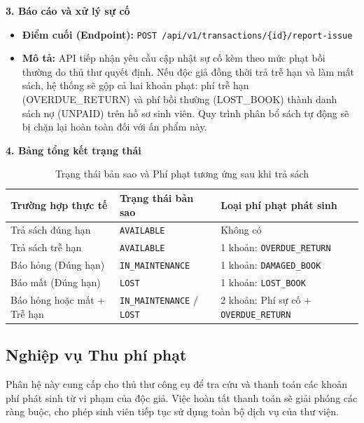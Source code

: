 \noindent\textbf{3. Báo cáo và xử lý sự cố}
\begin{itemize}
    \item \textbf{Điểm cuối (Endpoint):} \texttt{POST /api/v1/transactions/\{id\}/report-issue}
    \item \textbf{Mô tả:} API tiếp nhận yêu cầu cập nhật sự cố kèm theo mức phạt bồi thường do thủ thư quyết định. Nếu độc giả đồng thời trả trễ hạn và làm mất sách, hệ thống sẽ gộp cả hai khoản phạt: phí trễ hạn (OVERDUE\_RETURN) và phí bồi thường (LOST\_BOOK) thành danh sách nợ (UNPAID) trên hồ sơ sinh viên. Quy trình phân bổ sách tự động sẽ bị chặn lại hoàn toàn đối với ấn phẩm này.
\end{itemize}

\noindent\textbf{4. Bảng tổng kết trạng thái}
\begin{table}[H]
    \centering
    \caption{Trạng thái bản sao và Phí phạt tương ứng sau khi trả sách}
    \renewcommand{\arraystretch}{1.3}
    \begin{tabularx}{\textwidth}{|l|l|X|}
        \hline
        \textbf{Trường hợp thực tế} & \textbf{Trạng thái bản sao} & \textbf{Loại phí phạt phát sinh} \\ \hline
        Trả sách đúng hạn & \texttt{AVAILABLE} & Không có \\ \hline
        Trả sách trễ hạn & \texttt{AVAILABLE} & 1 khoản: \texttt{OVERDUE\_RETURN} \\ \hline
        Báo hỏng (Đúng hạn) & \texttt{IN\_MAINTENANCE} & 1 khoản: \texttt{DAMAGED\_BOOK} \\ \hline
        Báo mất (Đúng hạn) & \texttt{LOST} & 1 khoản: \texttt{LOST\_BOOK} \\ \hline
        Báo hỏng hoặc mất + Trễ hạn & \texttt{IN\_MAINTENANCE} / \texttt{LOST} & 2 khoản: Phí sự cố + \texttt{OVERDUE\_RETURN}  \\ \hline
    \end{tabularx}
\end{table}


\subsection{Nghiệp vụ Thu phí phạt}

Phân hệ này cung cấp cho thủ thư công cụ để tra cứu và thanh toán các khoản phí phát sinh từ vi phạm của độc giả. Việc hoàn tất thanh toán sẽ giải phóng các ràng buộc, cho phép sinh viên tiếp tục sử dụng toàn bộ dịch vụ của thư viện.

